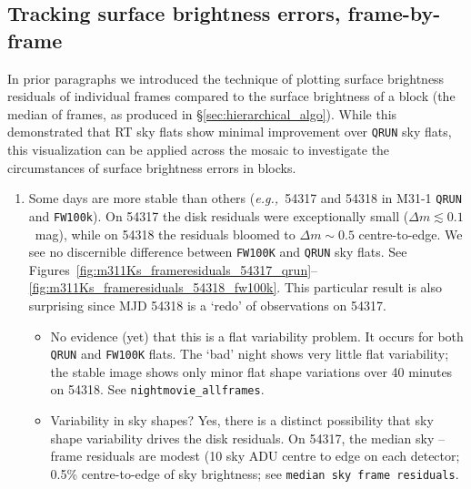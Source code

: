 \documentclass[iop]{emulateapj}
\newcommand{\eg}{\textit{e.g.,~}}
\newcommand{\Sec}[1]{\S\ref{sec:#1}}  %
\begin{document}
\subsection{Tracking surface brightness errors, frame-by-frame}
\label{sec:diskframeresiduals}

In prior paragraphs we introduced the technique of plotting surface brightness residuals of individual frames compared to the surface brightness of a block (the median of frames, as produced in \Sec{hierarchical_algo}).
While this demonstrated that RT sky flats show minimal improvement over \texttt{QRUN} sky flats, this visualization can be applied across the mosaic to investigate the circumstances of surface brightness errors in blocks.
\begin{enumerate}
  \item Some days are more stable than others (\eg 54317 and 54318 in M31-1 \texttt{QRUN} and \texttt{FW100k}). On 54317 the disk residuals were exceptionally small ($\Delta m \lesssim 0.1$~mag), while on 54318 the residuals bloomed to $\Delta m \sim 0.5$ centre-to-edge. We see no discernible difference between \texttt{FW100K} and \texttt{QRUN} sky flats. See Figures~\ref{fig:m311Ks_frameresiduals_54317_qrun}--\ref{fig:m311Ks_frameresiduals_54318_fw100k}. This particular result is also surprising since MJD 54318 is a `redo' of observations on 54317.
    \begin{itemize}
      \item No evidence (yet) that this is a flat variability problem. It occurs for both \texttt{QRUN} and \texttt{FW100K} flats. The `bad' night shows very little flat variability; the stable image shows only minor flat shape variations over 40 minutes on 54318. See \texttt{nightmovie\_allframes}.
      \item Variability in sky shapes? Yes, there is a distinct possibility that sky shape variability drives the disk residuals. On 54317, the median sky -- frame residuals are modest (10 sky ADU centre to edge on each detector; 0.5\% centre-to-edge of sky brightness; see \texttt{median sky frame residuals}.
    \end{itemize}
\end{enumerate}
\end{document}
